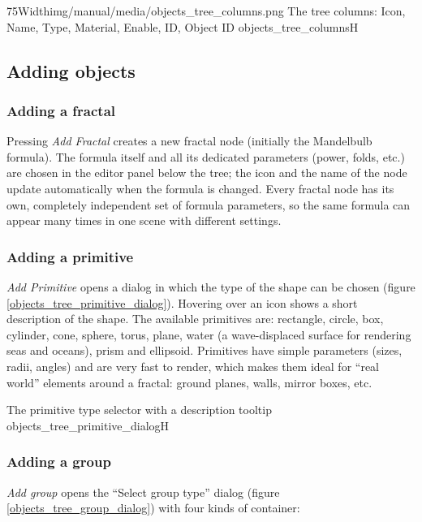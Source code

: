 \simpleImageWithCaption75Width{img/manual/media/objects_tree_columns.png}
{The tree columns: Icon, Name, Type, Material, Enable, ID, Object ID}
{objects_tree_columns}{H}

\subsection{Adding objects}\label{objects-tree-adding}

\subsubsection{Adding a fractal}

Pressing \emph{Add Fractal} creates a new fractal node (initially the Mandelbulb formula). The
formula itself and all its dedicated parameters (power, folds, etc.) are chosen in the editor panel
below the tree; the icon and the name of the node update automatically when the formula is changed.
Every fractal node has its own, completely independent set of formula parameters, so the same
formula can appear many times in one scene with different settings.

\subsubsection{Adding a primitive}

\emph{Add Primitive} opens a dialog in which the type of the shape can be chosen (figure
\ref{objects_tree_primitive_dialog}). Hovering over an icon shows a short description of the shape.
The available primitives are: rectangle, circle, box, cylinder, cone, sphere, torus, plane, water
(a wave-displaced surface for rendering seas and oceans), prism and ellipsoid. Primitives have
simple parameters (sizes, radii, angles) and are very fast to render, which makes them ideal for
``real world'' elements around a fractal: ground planes, walls, mirror boxes, etc.

{The primitive type selector with a description tooltip}
{objects_tree_primitive_dialog}{H}

\subsubsection{Adding a group}

\emph{Add group} opens the ``Select group type'' dialog (figure \ref{objects_tree_group_dialog}) with
four kinds of container:


